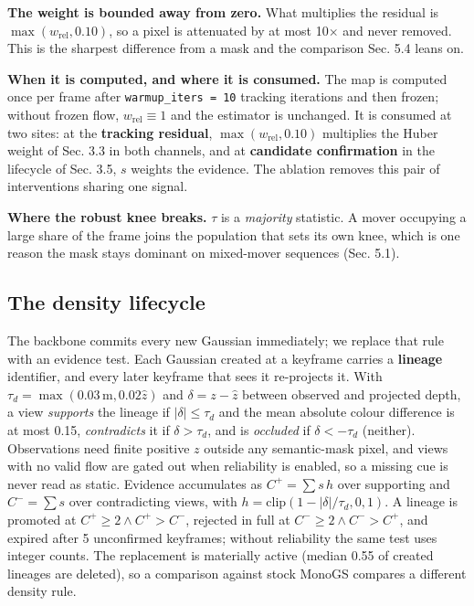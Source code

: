 \textbf{The weight is bounded away from zero.} What multiplies the residual is $\max(w_{\text{rel}}, 0.10)$, so a pixel is attenuated by at most 10$\times$ and never removed. This is the sharpest difference from a mask and the comparison Sec. 5.4 leans on.


\textbf{When it is computed, and where it is consumed.} The map is computed once per frame after \texttt{warmup\_iters = 10} tracking iterations and then frozen; without frozen flow, $w_{\text{rel}} \equiv 1$ and the estimator is unchanged. It is consumed at two sites: at the \textbf{tracking residual}, $\max(w_{\text{rel}}, 0.10)$ multiplies the Huber weight of Sec. 3.3 in both channels, and at \textbf{candidate confirmation} in the lifecycle of Sec. 3.5, $s$ weights the evidence. The ablation removes this pair of interventions sharing one signal.


\textbf{Where the robust knee breaks.} $\tau$ is a \emph{majority} statistic. A mover occupying a large share of the frame joins the population that sets its own knee, which is one reason the mask stays dominant on mixed-mover sequences (Sec. 5.1).


\subsection{The density lifecycle}


The backbone commits every new Gaussian immediately; we replace that rule with an evidence test. Each Gaussian created at a keyframe carries a \textbf{lineage} identifier, and every later keyframe that sees it re-projects it. With $\tau_d = \max(0.03\,\text{m}, 0.02\hat z)$ and $\delta = z - \hat z$ between observed and projected depth, a view \emph{supports} the lineage if $|\delta| \le \tau_d$ and the mean absolute colour difference is at most 0.15, \emph{contradicts} it if $\delta > \tau_d$, and is \emph{occluded} if $\delta < -\tau_d$ (neither). Observations need finite positive $z$ outside any semantic-mask pixel, and views with no valid flow are gated out when reliability is enabled, so a missing cue is never read as static. Evidence accumulates as $C^{+}{=}\sum s\,h$ over supporting and $C^{-}{=}\sum s$ over contradicting views, with $h = \mathrm{clip}(1-|\delta|/\tau_d,0,1)$. A lineage is promoted at $C^{+} \ge 2 \wedge C^{+} > C^{-}$, rejected in full at $C^{-} \ge 2 \wedge C^{-} > C^{+}$, and expired after 5 unconfirmed keyframes; without reliability the same test uses integer counts. The replacement is materially active (median 0.55 of created lineages are deleted), so a comparison against stock MonoGS compares a different density rule.


